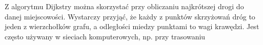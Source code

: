 \documentclass[preview]{standalone}
\begin{document}
\begin{center}
Z algorytmu Dijkstry można skorzystać przy obliczaniu najkrótszej drogi do danej miejscowości. Wystarczy przyjąć, że każdy z punktów skrzyżowań dróg to jeden z wierzchołków grafu, a odległości miedzy punktami to wagi krawędzi. Jest cz\k esto używany w sieciach komputerowych, np. przy trasowaniu
\end{center}
\end{document}
